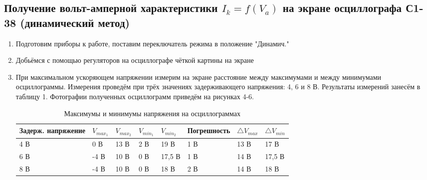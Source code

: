 \documentclass[a4paper, 12pt]{article}
\begin{document}
\subsection{Получение вольт-амперной характеристики $I_k = f(V_a)$ на экране осциллографа С1-38 (динамический метод)}
\begin{enumerate}
    \item Подготовим приборы к работе, поставим переключатель режима в положение "Динамич."
    \item Добьёмся с помощью регуляторов на осциллографе чёткой картины на экране
    \item При максимальном ускоряющем напряжении измерим на экране расстояние между максимумами и между минимумами осциллограммы. Измерения проведём при трёх значениях задерживающего напряжения: 4, 6 и 8 В. Результаты измерений занесём в таблицу 1. Фотографии полученных осциллограмм приведём на рисунках 4-6.
 
\begin{table}[h]
    \centering
    \begin{center}
    \caption{Максимумы и минимумы напряжения на осциллограммах}
    \end{center}
    \vspace{0.1cm}
    \label{tab:my_label}
    \begin{tabular}{ |p{3.5cm}||p{1cm}|p{1cm}|p{1cm}|p{1cm}|p{2.5cm}|p{1cm}|p{1cm}|}
 \hline
Задерж. напряжение & $V_{max_1}$ & $V_{max_2}$ & $V_{min_1}$ & $V_{min_2}$ & Погрешность & $\triangle V_{max}$ & $\triangle V_{min}$\\
 \hline
 4 В & 0 В & 13 В & 2 В & 19 В & 1 В & 13 В & 17 В\\
\hline
 6 В & -4 В & 10 В & 0 В & 17,5 В & 1 В & 14 В & 17,5 В\\
\hline
 8 В & -4 В & 10 В & 0 В & 18 В & 2 В & 14 В & 18 В\\
\hline

\end{tabular}
\end{table} 
    

\end{enumerate}
\end{document}
